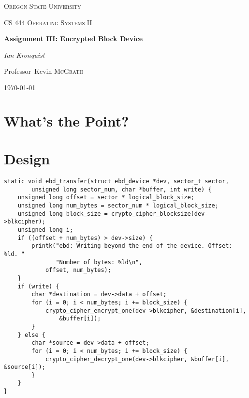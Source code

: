 \documentclass[10pt,conference,draftclsnofoot,onecolumn]{IEEEtran}
\begin{document}
\begin{titlepage}
    \centering
    {\scshape\LARGE Oregon State University \par}
    \vspace{1cm}
    {\scshape\Large CS 444 Operating Systems II\par}
    \vspace{1.5cm}
    {\huge\bfseries Assignment III: Encrypted Block Device\par}
    \vspace{2cm}
    {\Large\itshape Ian Kronquist\par}
    \vfill
    \par
    Professor~Kevin \textsc{McGrath}

    \vfill

    {\large \today\par}
\end{titlepage}


\author{
}


\begin{abstract}
The goal of this project was to build an encrypted RAM Disk device driver in the form of a .
\end{abstract}

\bigskip
\bigskip
\bigskip

\section{What's the Point?}
\section{Design}

\begin{lstlisting}
static void ebd_transfer(struct ebd_device *dev, sector_t sector,
        unsigned long sector_num, char *buffer, int write) {
    unsigned long offset = sector * logical_block_size;
    unsigned long num_bytes = sector_num * logical_block_size;
    unsigned long block_size = crypto_cipher_blocksize(dev->blkcipher);
    unsigned long i;
    if ((offset + num_bytes) > dev->size) {
        printk("ebd: Writing beyond the end of the device. Offset: %ld. "
               "Number of bytes: %ld\n",
            offset, num_bytes);
    }
    if (write) {
        char *destination = dev->data + offset;
        for (i = 0; i < num_bytes; i += block_size) {
            crypto_cipher_encrypt_one(dev->blkcipher, &destination[i],
                &buffer[i]);
        }
    } else {
        char *source = dev->data + offset;
        for (i = 0; i < num_bytes; i += block_size) {
            crypto_cipher_decrypt_one(dev->blkcipher, &buffer[i], &source[i]);
        }
    }
}
\end{lstlisting}
\end{document}
